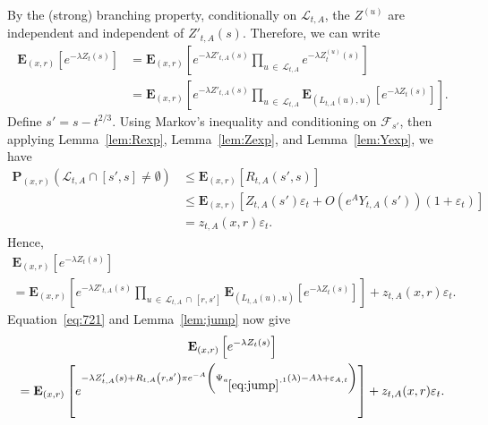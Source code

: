 \documentclass[10pt]{amsart}
\theoremstyle{definition}\newtheorem{defi}[theo]{Definition}\newtheorem{rema}[theo]{Remark}\newtheorem{exam}[theo]{Example}\newtheorem{exem}[theo]{Example}\newtheorem{nota}[theo]{Notation}
\newcommand*\eps{\varepsilon}
\newcommand*\E{\mathbf{E}}
\renewcommand*\P{\mathbf{P}}
\newcommand\F{\mathcal{F}}
\renewcommand{\L}{\mathcal{L}}
\newcommand{\1} {\mathds{1}}
\begin{document}
By the (strong) branching property, conditionally on $\L_{t,A}$, the $Z^{(u)}$ are independent and independent of $Z'_{t,A}(s)$. Therefore, we can write
\begin{align*}
\E_{(x,r)}\left[e^{-\lambda Z_t(s)}\right] &= \E_{(x,r)}\left[e^{-\lambda Z'_{t,A}(s)} \prod_{u\,\in\,\L_{t,A}} e^{-\lambda Z^{(u)}_t(s)}\right]\\
&= \E_{(x,r)}\left[e^{-\lambda Z'_{t,A}(s)} \prod_{u\,\in\,\L_{t,A}} \E_{\left(L_{t,A}(u),u\right)}\left[e^{-\lambda Z_t(s)}\right]\right].
\end{align*}
Define $s'=s-t^{2/3}$. Using Markov's inequality and conditioning on $\F_{s'}$, then applying Lemma~\ref{lem:Rexp}, Lemma~\ref{lem:Zexp}, and Lemma~\ref{lem:Yexp}, we have
\begin{align*}
\P_{(x,r)}\left(\L_{t,A} \cap \left[s',s\right]\ne \emptyset\right) &\le \E_{(x,r)}\left[R_{t,A}\left(s',s\right)\right] \\
&\le \E_{(x,r)}\left[Z_{t,A}(s')\eps_t + O\left(e^A Y_{t,A}\left(s'\right)\right)\left(1 + \eps_t\right)\right]\\
&= z_{t,A}(x,r)\eps_t.
\end{align*}
Hence,
\begin{multline}\label{eq:721}
\E_{(x,r)}\left[e^{-\lambda Z_t(s)}\right] \\
= \E_{(x,r)}\left[e^{-\lambda Z'_{t,A}(s)} \prod_{u\,\in\,\L_{t,A}\,\cap\,\left[r,s'\right]} \E_{\left(L_{t,A}(u),u\right)}\left[e^{-\lambda Z_t(s)}\right]\right] + z_{t,A}(x,r)\eps_t.
\end{multline}
Equation~\eqref{eq:721} and Lemma~\ref{lem:jump} now give
\begin{multline}\label{eq:722}
\E_{(x,r)}\left[e^{-\lambda Z_t(s)}\right]\\
 = \E_{(x,r)}\left[e^{-\lambda Z'_{t,A}(s) + R_{t,A}\left(r,s'\right)\pi e^{-A}\left(\Psi_{a_{\eqref{eq:jump}},1}(\lambda) - A\lambda + \eps_{A,t}\right)}\right] + z_{t,A}(x,r)\eps_t.
\end{multline}
\end{document}
